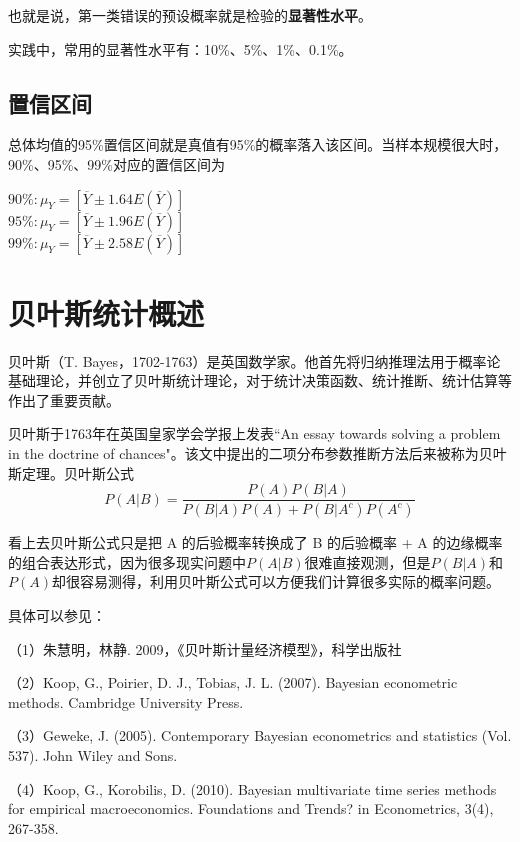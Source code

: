 \documentclass[cn,12pt,math=newtx,citestyle=gb7714-2015,bibstyle=gb7714-2015]{elegantbook}
\begin{document}
	也就是说，第一类错误的预设概率就是检验的\textbf{显著性水平}。
	
	实践中，常用的显著性水平有：10\%、5\%、1\%、0.1\%。
	
	\subsection{置信区间}
	
	总体均值的95\%置信区间就是真值有95\%的概率落入该区间。当样本规模很大时，90\%、95\%、99\%对应的置信区间为
	\begin{center}
		$90\%:\mu_Y=[\overline{Y}\pm{1.64E(\overline{Y})}]$\\
		$95\%:\mu_Y=[\overline{Y}\pm{1.96E(\overline{Y})}]$\\
		$99\%:\mu_Y=[\overline{Y}\pm{2.58E(\overline{Y})}]$
	\end{center}
	
	\section{贝叶斯统计概述}
	贝叶斯（T. Bayes，1702-1763）是英国数学家。他首先将归纳推理法用于概率论基础理论，并创立了贝叶斯统计理论，对于统计决策函数、统计推断、统计估算等作出了重要贡献。
	
	贝叶斯于1763年在英国皇家学会学报上发表“An essay towards solving a problem in the doctrine of chances"。该文中提出的二项分布参数推断方法后来被称为贝叶斯定理。贝叶斯公式
	\begin{equation}
		P(A|B)=\frac{P(A)P(B|A)}{P(B|A)P(A)+P(B|A^c)P(A^c)}
	\end{equation}
	
	看上去贝叶斯公式只是把 A 的后验概率转换成了 B 的后验概率 + A 的边缘概率的组合表达形式，因为很多现实问题中$P(A|B)$很难直接观测，但是$P(B|A)$和$P(A)$却很容易测得，利用贝叶斯公式可以方便我们计算很多实际的概率问题。
	
	具体可以参见：
	
	（1）朱慧明，林静. 2009，《贝叶斯计量经济模型》，科学出版社
	
	（2）Koop, G., Poirier, D. J.,  Tobias, J. L. (2007). Bayesian econometric methods. Cambridge University Press.
	
	（3）Geweke, J. (2005). Contemporary Bayesian econometrics and statistics (Vol. 537). John Wiley and Sons.
	
	（4）Koop, G.,  Korobilis, D. (2010). Bayesian multivariate time series methods for empirical macroeconomics. Foundations and Trends? in Econometrics, 3(4), 267-358.
	
\end{document}

